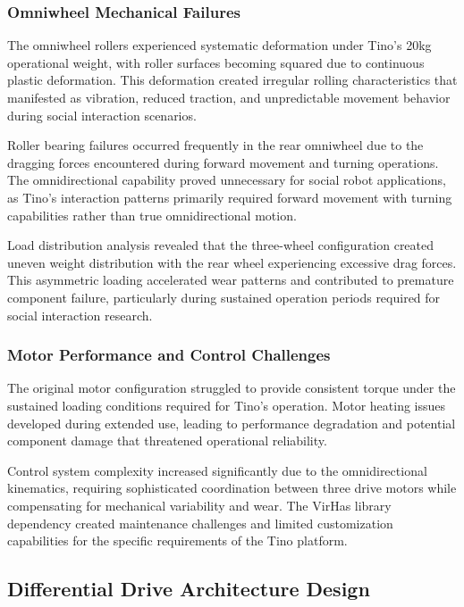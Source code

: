 \subsubsection{Omniwheel Mechanical Failures}

The omniwheel rollers experienced systematic deformation under Tino's 20kg operational weight, with roller surfaces becoming squared due to continuous plastic deformation. This deformation created irregular rolling characteristics that manifested as vibration, reduced traction, and unpredictable movement behavior during social interaction scenarios.

Roller bearing failures occurred frequently in the rear omniwheel due to the dragging forces encountered during forward movement and turning operations. The omnidirectional capability proved unnecessary for social robot applications, as Tino's interaction patterns primarily required forward movement with turning capabilities rather than true omnidirectional motion.

Load distribution analysis revealed that the three-wheel configuration created uneven weight distribution with the rear wheel experiencing excessive drag forces. This asymmetric loading accelerated wear patterns and contributed to premature component failure, particularly during sustained operation periods required for social interaction research.

\subsubsection{Motor Performance and Control Challenges}

The original motor configuration struggled to provide consistent torque under the sustained loading conditions required for Tino's operation. Motor heating issues developed during extended use, leading to performance degradation and potential component damage that threatened operational reliability.

Control system complexity increased significantly due to the omnidirectional kinematics, requiring sophisticated coordination between three drive motors while compensating for mechanical variability and wear. The VirHas library dependency created maintenance challenges and limited customization capabilities for the specific requirements of the Tino platform.

\subsection{Differential Drive Architecture Design}

